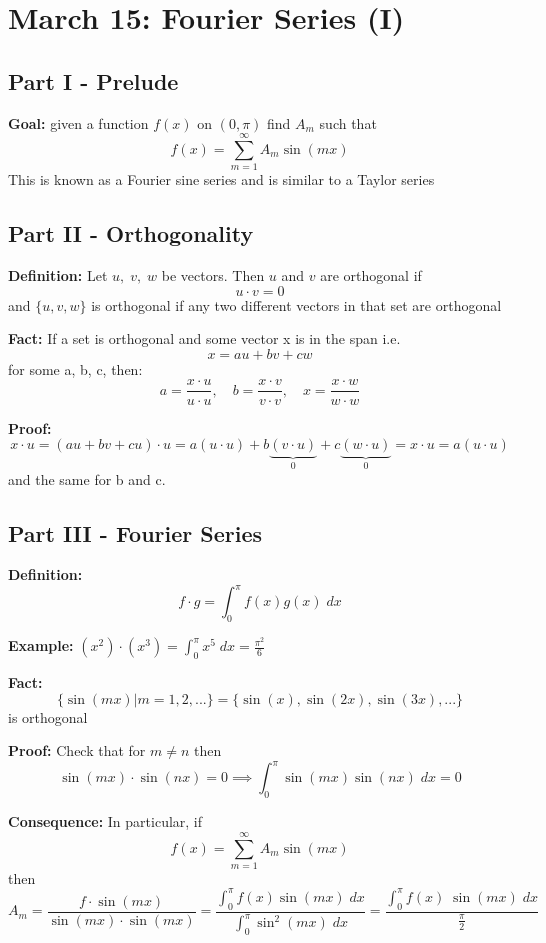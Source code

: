 \documentclass[12pt]{article}
\begin{document}
\section{March 15: Fourier Series (I)}
\subsection*{Part I - Prelude}
\textbf{Goal:} given a function $f(x)$ on $(0, \pi)$ find $A_m$ such that 
\[f(x) = \sum_{m=1}^\infty A_m \sin(mx)\]
This is known as a Fourier sine series and is similar to a Taylor series 

\subsection*{Part II - Orthogonality}
\textbf{Definition:} Let $u, \; v, \; w$ be vectors. Then $u$ and $v$ are orthogonal if 
\[u \cdot v = 0\]
and $\{u, v , w\}$ is orthogonal if any two different vectors in that set are orthogonal

\textbf{Fact:} If a set is orthogonal and some vector x is in the span i.e.
\[x = au + bv + cw\]
for some a, b, c, then: 
\[a = \frac{x \cdot u}{u \cdot u}, \quad b = \frac{x \cdot v}{v \cdot v}, \quad x = \frac{x \cdot w}{w \cdot w}\]

\textbf{Proof:} 
\[x \cdot u = (au + bv + cu)\cdot u = a(u\cdot u)+b\underbrace{(v \cdot u)}_0 + c\underbrace{(w \cdot u)}_0= x \cdot u = a(u \cdot u)\]
and the same for b and c. 

\subsection*{Part III - Fourier Series}
\textbf{Definition:} 
\[\boxed{f \cdot g = \int_0^\pi f(x) g(x)\; dx}\]

\textbf{Example:} $(x^2) \cdot (x^3) = \int_0^\pi x^5\; dx = \frac{\pi^2}{6}$

\textbf{Fact:} 
\[\{\sin(mx) | m = 1, 2, ...\} = \{\sin(x), \sin(2x), \sin(3x), ...\}\] 
is orthogonal 

\textbf{Proof:} Check that for $m \neq n$ then 
\[\sin(mx) \cdot \sin(nx) = 0 \implies \int_0^\pi \sin(mx) \sin(nx) \; dx = 0\]

\textbf{Consequence:} In particular, if 
\[f(x) = \sum_{m=1}^\infty A_m \sin(mx)\]
then 
\[A_m = \frac{f \cdot \sin(mx)}{\sin(mx) \cdot \sin(mx)} = \frac{\int_0^\pi f(x) \sin(mx)\; dx}{\int_0^\pi \sin^2(mx) \; dx} = \frac{\int_0^\pi f(x)\; \sin(mx)\; dx}{\frac{\pi}{2}}\]
\end{document}
